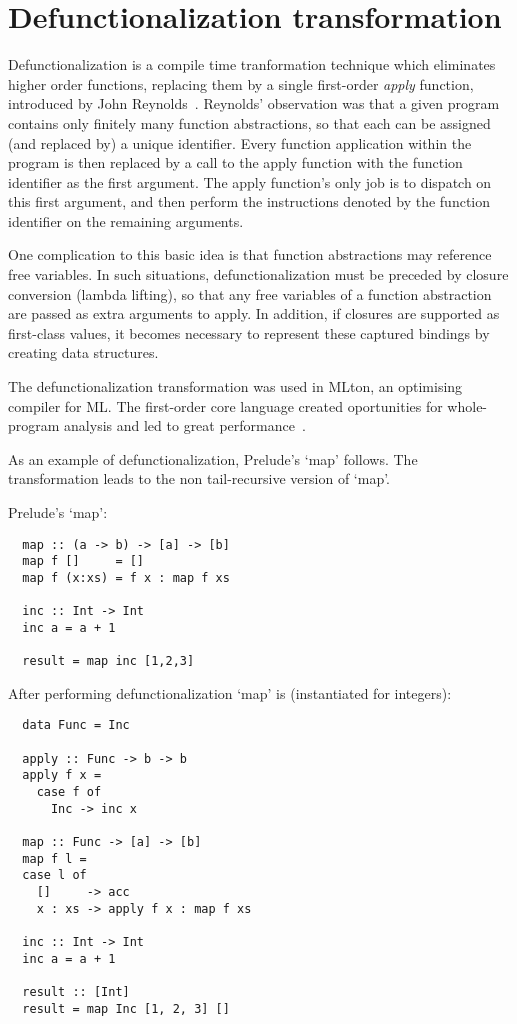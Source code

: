 \documentclass[diploma]{softlab-thesis}
\begin{document}
\section {Defunctionalization transformation}
\label{sec:defunctionalization}

Defunctionalization is a compile time tranformation technique which eliminates higher order 
functions, replacing them by a single first-order \textit{apply} function, introduced by John Reynolds~\cite{Reynolds72definitionalinterpreters}.
Reynolds' observation was that a given program contains only finitely many function abstractions, so that each can 
be assigned (and replaced by) a unique identifier. Every function application within the program is then replaced 
by a call to the apply function with the function identifier as the first argument. The apply function's only job is 
to dispatch on this first argument, and then perform the instructions denoted by the function identifier on the 
remaining arguments.

One complication to this basic idea is that function abstractions may reference free variables. In such situations, 
defunctionalization must be preceded by closure conversion (lambda lifting), so that any free variables of a function 
abstraction are passed as extra arguments to apply. In addition, if closures are supported as first-class values, 
it becomes necessary to represent these captured bindings by creating data structures.

The defunctionalization transformation was used in MLton, an optimising compiler for ML. The first-order
core language created oportunities for whole-program analysis and led to great performance~\cite{mlton}.

As an example of defunctionalization, Prelude's `map' follows. The transformation leads to 
the non tail-recursive version of `map'.

Prelude's `map':

\begin{verbatim}
  map :: (a -> b) -> [a] -> [b]
  map f []     = []
  map f (x:xs) = f x : map f xs

  inc :: Int -> Int 
  inc a = a + 1
  
  result = map inc [1,2,3]
\end{verbatim}

After performing defunctionalization `map' is (instantiated for integers):
\begin{verbatim}
  data Func = Inc 

  apply :: Func -> b -> b
  apply f x =
    case f of
      Inc -> inc x

  map :: Func -> [a] -> [b]
  map f l =
  case l of
    []     -> acc
    x : xs -> apply f x : map f xs

  inc :: Int -> Int 
  inc a = a + 1

  result :: [Int]
  result = map Inc [1, 2, 3] []
\end{verbatim}
\end{document}
